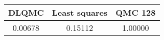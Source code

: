 \begin{tabular}{|c|c|c|}
\hline
DLQMC&Least squares&QMC 128\\ 
\hline

0.00678 & 0.15112 & 1.00000\\ 
\hline
\end{tabular}

